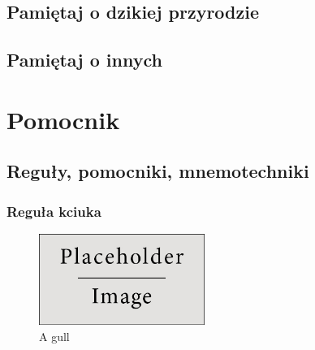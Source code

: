 \documentclass[11pt,fleqn]{book} %
\begin{document}

\chapter{Pamiętaj o dzikiej przyrodzie}
\label{rule6-wildlife}


\chapter{Pamiętaj o innych}
\label{rule7-others}


\part{Pomocnik}



\chapter{Reguły, pomocniki, mnemotechniki}

\section{Reguła kciuka}\label{regula-kciuka}
\lipsum
\begin{figure}
	\begin{center}
		\includegraphics[width=0.48\textwidth]{Pictures/placeholder}
	\end{center}
	\caption{A gull}
\end{figure}
\end{document}
